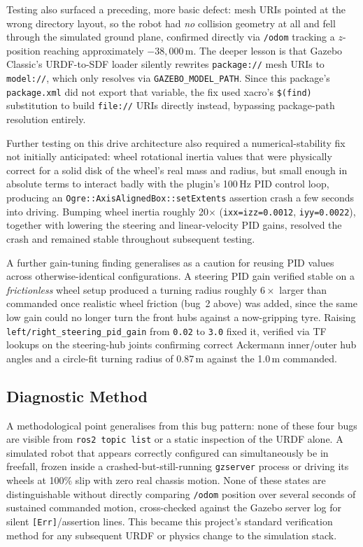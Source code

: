 Testing also surfaced a preceding, more basic defect: mesh URIs
pointed at the wrong directory layout, so the robot had \emph{no}
collision geometry at all and fell through the simulated ground
plane, confirmed directly via \texttt{/odom} tracking a $z$-position
reaching approximately $-38{,}000$\,m. The deeper lesson is that
Gazebo Classic's URDF-to-SDF loader silently rewrites
\texttt{package://} mesh URIs to \texttt{model://}, which only
resolves via \texttt{GAZEBO\_MODEL\_PATH}. Since this package's
\texttt{package.xml} did not export that variable, the fix used
xacro's \texttt{\$(find)} substitution to build \texttt{file://} URIs
directly instead, bypassing package-path resolution entirely.

Further testing on this drive architecture also required a
numerical-stability fix not initially anticipated: wheel rotational
inertia values that were physically correct for a solid disk of the
wheel's real mass and radius, but small enough in absolute terms to
interact badly with the plugin's 100\,Hz PID control loop, producing
an \texttt{Ogre::AxisAlignedBox::setExtents} assertion crash a few
seconds into driving. Bumping wheel inertia roughly 20$\times$
(\texttt{ixx=izz=0.0012}, \texttt{iyy=0.0022}), together with
lowering the steering and linear-velocity PID gains, resolved the
crash and remained stable throughout subsequent testing.

A further gain-tuning finding generalises as a caution for reusing
PID values across otherwise-identical configurations. A steering PID
gain verified stable on a \emph{frictionless} wheel setup produced a
turning radius roughly $6\times$ larger than commanded once realistic
wheel friction (bug~2 above) was added, since the same low gain could
no longer turn the front hubs against a now-gripping tyre. Raising
\texttt{left/right\_steering\_pid\_gain} from \texttt{0.02} to
\texttt{3.0} fixed it, verified via TF lookups on the steering-hub
joints confirming correct Ackermann inner/outer hub angles and a
circle-fit turning radius of 0.87\,m against the 1.0\,m commanded.

\subsection{Diagnostic Method}
\label{sec:diagnostic-method}

A methodological point generalises from this bug pattern: none of
these four bugs are visible from \texttt{ros2 topic
list} or a static inspection of the URDF alone. A simulated robot
that appears correctly configured can simultaneously be in freefall,
frozen inside a crashed-but-still-running \texttt{gzserver} process
or driving its wheels at 100\% slip with zero real chassis motion.
None of these states are distinguishable without directly comparing
\texttt{/odom} position over several seconds of sustained commanded
motion, cross-checked against the Gazebo server log for silent
\texttt{[Err]}/assertion lines. This became this project's
standard verification method for any subsequent URDF or physics
change to the simulation stack.

